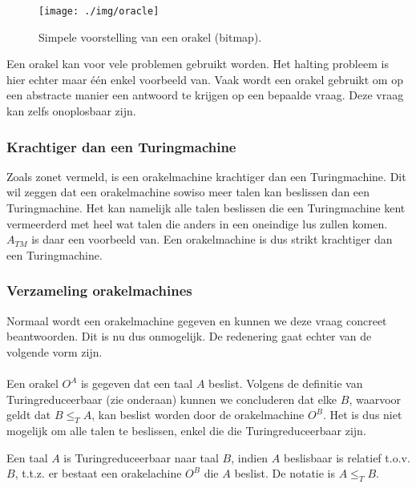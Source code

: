 \vspace{3mm}
\begin{figure}[h!]
  \centering
      \texttt{[image: ./img/oracle]}
  \caption{Simpele voorstelling van een orakel (bitmap).}
\end{figure}
\vspace{3mm}

Een orakel kan voor vele problemen gebruikt worden. Het halting probleem is hier echter maar \'e\'en enkel voorbeeld van. Vaak wordt een orakel gebruikt om op een abstracte manier een antwoord te krijgen op een bepaalde vraag. Deze vraag kan zelfs onoplosbaar zijn.

\subsubsection*{Krachtiger dan een Turingmachine}

Zoals zonet vermeld, is een orakelmachine krachtiger dan een Turingmachine. Dit wil zeggen dat een orakelmachine sowiso meer talen kan beslissen dan een Turingmachine. Het kan namelijk alle talen beslissen die een Turingmachine kent vermeerderd met heel wat talen die anders in een oneindige lus zullen komen. $A_{TM}$ is daar een voorbeeld van. Een orakelmachine is dus strikt krachtiger dan een Turingmachine.

\subsubsection*{Verzameling orakelmachines}

Normaal wordt een orakelmachine gegeven en kunnen we deze vraag concreet beantwoorden. Dit is nu dus onmogelijk. De redenering gaat echter van de volgende vorm zijn.
\\\\
Een orakel $O^A$ is gegeven dat een taal $A$ beslist. Volgens de definitie van Turingreduceerbaar (zie onderaan) kunnen we concluderen dat elke $B$, waarvoor geldt dat $B \leq_T A$, kan beslist worden door de orakelmachine $O^B$. Het is dus niet mogelijk om alle talen te beslissen, enkel die die Turingreduceerbaar zijn.

\begin{theorem}[Turingreduceerbaar]
	Een taal $A$ is Turingreduceerbaar naar taal $B$, indien $A$ beslisbaar is relatief t.o.v. $B$, t.t.z. er bestaat een orakelachine $O^B$ die $A$ beslist. De notatie is $A \leq_T B$.
\end{theorem}

